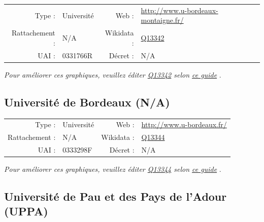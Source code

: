 \documentclass[12pt,french,landscape]{article}
\begin{document}
\begin{tabular*}{0.45\textwidth}{rp{2cm}rl}  
\hline  
Type : & Université & Web : &\href{http://www.u-bordeaux-montaigne.fr/}{http://www.u-bordeaux-montaigne.fr/} \\  
Rattachement : & N/A & Wikidata : & \href{https://www.wikidata.org/entity/Q13342}{Q13342} \\  
UAI : & 0331766R & Décret : & N/A \\  
\hline  
\end{tabular*}

\textit{\scriptsize Pour améliorer ces graphiques, veuillez éditer \href{https://www.wikidata.org/entity/Q13342}{Q13342}  selon \href{https://github.com/cpesr/wikidataESR/blob/master/Rmd/wikidataESR.md}{ce guide}}
.


\newpage

\hypertarget{universituxe9-de-bordeaux-na}{%
\subsection{Université de Bordeaux
(N/A)}\label{universituxe9-de-bordeaux-na}}

\begin{tabular*}{0.45\textwidth}{rp{2cm}rl}  
\hline  
Type : & Université & Web : &\href{http://www.u-bordeaux.fr/}{http://www.u-bordeaux.fr/} \\  
Rattachement : & N/A & Wikidata : & \href{https://www.wikidata.org/entity/Q13344}{Q13344} \\  
UAI : & 0333298F & Décret : & N/A \\  
\hline  
\end{tabular*}

\textit{\scriptsize Pour améliorer ces graphiques, veuillez éditer \href{https://www.wikidata.org/entity/Q13344}{Q13344}  selon \href{https://github.com/cpesr/wikidataESR/blob/master/Rmd/wikidataESR.md}{ce guide}}
.


\newpage

\hypertarget{universituxe9-de-pau-et-des-pays-de-ladour-uppa}{%
\subsection{Université de Pau et des Pays de l'Adour
(UPPA)}\label{universituxe9-de-pau-et-des-pays-de-ladour-uppa}}
\end{document}
